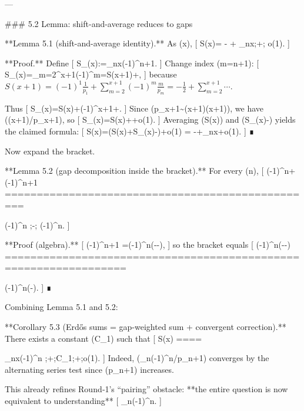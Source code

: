 ---

### 5.2 Lemma: shift-and-average reduces to gaps

**Lemma 5.1 (shift-and-average identity).**
As (x\to\infty),
[
S(x)= - + \sum_{n\le x} ;+; o(1).
]

**Proof.**
Define
[
S_{}(x):=\sum_{n\le x}(-1)^{n+1}.
]
Change index (m=n+1):
[
S_{}(x)=\sum_{m=2}^{x+1}(-1)^m=S(x+1)+,
]
because \(S(x+1)=(-1)^1\frac1{p_1}+\sum_{m=2}^{x+1}(-1)^m\frac{m}{p_m}=-\frac12+\sum_{m=2}^{x+1}\cdots\).

Thus
[
S_{}(x)=S(x)+(-1)^{x+1}+.
]
Since (p_{x+1}\sim (x+1)\log(x+1)), we have ((x+1)/p_{x+1}), so
[
S_{}(x)=S(x)++o(1).
]
Averaging (S(x)) and (S_{}(x)-) yields the claimed formula:
[
S(x)=\Bigl(S(x)+S_{}(x)-\Bigr)+o(1)
= -+\sum_{n\le x}+o(1).
]
∎

Now expand the bracket.

**Lemma 5.2 (gap decomposition inside the bracket).** For every (n),
[
(-1)^n+(-1)^{n+1}
=================================================

(-1)^n
;-;
(-1)^n.
]

**Proof (algebra).**
[
(-1)^{n+1}
=(-1)^n\Bigl(--\Bigr),
]
so the bracket equals
[
(-1)^n\Bigl(--\Bigr)
=================================================================

(-1)^n\Bigl(-\Bigr).
]
∎

Combining Lemma 5.1 and 5.2:

**Corollary 5.3 (Erdős sums = gap-weighted sum + convergent correction).**
There exists a constant (C_1) such that
[
S(x)
====

\sum_{n\le x}(-1)^n
;+;C_1;+;o(1).
]
Indeed, (\sum_{n}(-1)^n/p_{n+1}) converges by the alternating series test since (p_{n+1}) increases.

This already refines Round‑1’s “pairing” obstacle: **the entire question is now equivalent to understanding**
[
\sum_{n}(-1)^n.
]

